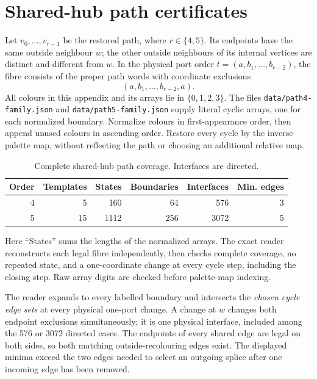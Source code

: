 \documentclass[11pt]{article}
\numberwithin{equation}{section}
\numberwithin{table}{section}
\begin{document}
\clearpage
\section{Shared-hub path certificates}
\label{app:shared-hub-path-certificates}
Let $v_0,\ldots,v_{r-1}$ be the restored path, where $r\in\{4,5\}$.
Its endpoints have the same outside neighbour $w$; the other outside
neighbours of its internal vertices are distinct and different from $w$.
In the physical port order $t=(a,b_1,\ldots,b_{r-2})$, the fibre consists
of the proper path words with coordinate exclusions
\[
 (a,b_1,\ldots,b_{r-2},a).
\]
All colours in this appendix and its arrays lie in $\{0,1,2,3\}$.
The files \texttt{data/path4-family.json} and
\texttt{data/path5-family.json} supply literal cyclic arrays, one for
each normalized boundary. Normalize colours in first-appearance order,
then append unused colours in ascending order. Restore every cycle by
the inverse palette map, without reflecting the path or choosing
an additional relative map.

\begin{table}[htbp]
\centering
\caption{Complete shared-hub path coverage. Interfaces are directed.}
\label{tab:shared-hub-path-counts}
\begin{tabular}{rrrrrr}
\toprule
Order & Templates & States & Boundaries & Interfaces & Min. edges\\
\midrule
4&5&160&64&576&3\\
5&15&1112&256&3072&5\\
\bottomrule
\end{tabular}
\end{table}

Here ``States'' sums the lengths of the normalized arrays. The exact
reader reconstructs each legal fibre independently, then checks complete
coverage, no repeated state, and a one-coordinate change at every cycle
step, including the closing step. Raw array digits are checked before
palette-map indexing.

The reader expands to every labelled boundary and intersects the
\emph{chosen cycle edge sets} at every physical one-port change.
A change at $w$ changes both endpoint exclusions simultaneously; it is
one physical interface, included among the 576 or 3072 directed cases.
The endpoints of every shared edge are legal on both sides, so both
matching outside-recolouring edges exist. The displayed minima exceed
the two edges needed to select an outgoing splice after one incoming
edge has been removed.
\end{document}
